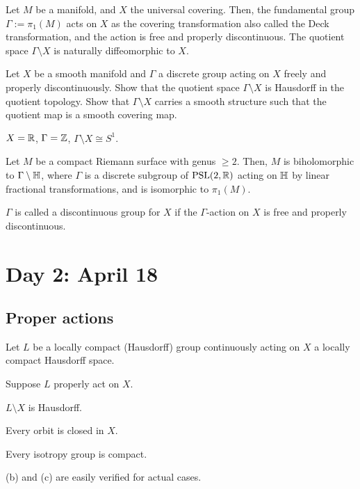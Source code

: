 \documentclass{../../../small}
\begin{document}
\begin{ex}
Let $M$ be a manifold, and $X$ the universal covering.
Then, the fundamental group $\Gamma:=\pi_1(M)$ acts on $X$ as the covering transformation also called the Deck transformation, and the action is free and properly discontinuous.
The quotient space $\Gamma\setminus X$ is naturally diffeomorphic to $X$.
\end{ex}

\begin{exe}
Let $X$ be a smooth manifold and $\Gamma$ a discrete group acting on $X$ freely and properly discontinuously.
Show that the quotient space $\Gamma\setminus X$ is Hausdorff in the quotient topology.
Show that $\Gamma\setminus X$ carries a smooth structure such that the quotient map is a smooth covering map.
\end{exe}

\begin{ex}
$X=\mathbb{R}$, $\Gamma=\mathbb{Z}$, $\Gamma\setminus X\cong S^1$.
\end{ex}
\begin{ex}
Let $M$ be a compact Riemann surface with genus $\ge2$.
Then, $M$ is biholomorphic to $\Gamma\setminus\mathbb{H}$, where $\Gamma$ is a discrete subgroup of $\mathrm{PSL}(2,\mathbb{R})$ acting on $\mathbb{H}$ by linear fractional transformations, and is isomorphic to $\pi_1(M)$.
\end{ex}

$\Gamma$ is called a discontinuous group for $X$ if the $\Gamma$-action on $X$ is free and properly discontinuous.




\newpage
\setcounter{section}{1}
\section{Day 2: April 18}
\setcounter{section}{2}

\subsection*{Proper actions}
Let $L$ be a locally compact (Hausdorff) group continuously acting on $X$ a locally compact Hausdorff space.



\setcounter{thm}{2}

\begin{thm}
Suppose $L$ properly act on $X$.
\begin{parts}
\item $L\setminus X$ is Hausdorff.
\item Every orbit is closed in $X$.
\item Every isotropy group is compact.
\end{parts}
\end{thm}
\begin{rmk}
(b) and (c) are easily verified for actual cases.
\end{rmk}
\end{document}
